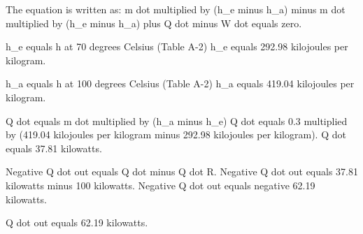 The equation is written as:  
m dot multiplied by (h_e minus h_a) minus m dot multiplied by (h_e minus h_a) plus Q dot minus W dot equals zero.  

h_e equals h at 70 degrees Celsius (Table A-2)  
h_e equals 292.98 kilojoules per kilogram.  

h_a equals h at 100 degrees Celsius (Table A-2)  
h_a equals 419.04 kilojoules per kilogram.  

Q dot equals m dot multiplied by (h_a minus h_e)  
Q dot equals 0.3 multiplied by (419.04 kilojoules per kilogram minus 292.98 kilojoules per kilogram).  
Q dot equals 37.81 kilowatts.  

Negative Q dot out equals Q dot minus Q dot R.  
Negative Q dot out equals 37.81 kilowatts minus 100 kilowatts.  
Negative Q dot out equals negative 62.19 kilowatts.  

Q dot out equals 62.19 kilowatts.